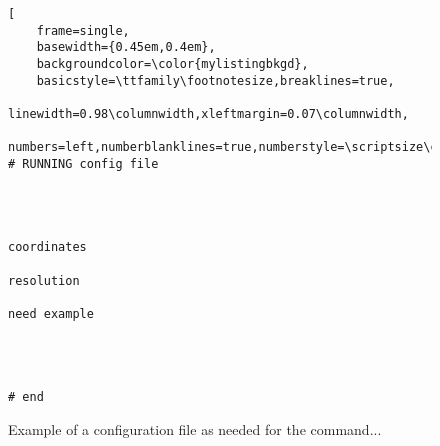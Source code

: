 
\begin{figure}[th]
\begin{lstlisting}[
	frame=single,
	basewidth={0.45em,0.4em},
	backgroundcolor=\color{mylistingbkgd},
	basicstyle=\ttfamily\footnotesize,breaklines=true,
	linewidth=0.98\columnwidth,xleftmargin=0.07\columnwidth,
	numbers=left,numberblanklines=true,numberstyle=\scriptsize\color{mylistingnclr}]
# RUNNING config file




coordinates

resolution

need example




# end
\end{lstlisting}
\caption{Example of a configuration file as needed for the command...}
\label{fig:run-config}
\end{figure}
